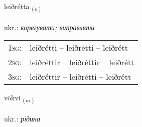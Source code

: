\documentclass[frontgrid, backgrid]{flacards}\usepackage[]{graphicx}\usepackage[]{xcolor}
\begin{document}
\renewcommand{\flhead}{\vskip5pt \fboxsep=0pt {\small\bfseries\footnotesize Nafnorð | дієслово}}
\renewcommand{\fcfoot}{\vskip5pt \fboxsep=0pt \hspace{2pt}{\small\bfseries\footnotesize 3K}}

\renewcommand{\blhead}{\vskip5pt {\small\bfseries\footnotesize Nafnorð | дієслово }}
\renewcommand{\bcfoot}{\vskip5pt \hspace{2pt}{\small\bfseries\footnotesize 3K}}


{leiðrétta \small{\textsubscript{(\textit{v.})}} \\[1ex] %
\textphonetic{[leiðrjɛhta]} \\
ukr.: \emph{корегувати; виправляти} \\  [2ex]
\renewcommand*{\arraystretch}{0.8}
\begin{tabular}{p{1cm}l}
\textsc{1sg}: & leiðrétti -- leiðrétti -- leiðrétt \\ 
\textsc{2sg}: & leiðréttir -- leiðréttir -- leiðrétt \\ 
\textsc{3sg}: & leiðréttir -- leiðrétti -- leiðrétt \\ 
\end{tabular}
}

\renewcommand{\flhead}{\vskip5pt \fboxsep=0pt {\small\bfseries\footnotesize Nafnorð | іменник}}
\renewcommand{\fcfoot}{\vskip5pt \fboxsep=0pt \hspace{2pt}{\small\bfseries\footnotesize 3K}}

\renewcommand{\blhead}{\vskip5pt {\small\bfseries\footnotesize Nafnorð | іменник }}
\renewcommand{\bcfoot}{\vskip5pt \hspace{2pt}{\small\bfseries\footnotesize 3K}}


{vökvi \small{\textsubscript{(\textit{m.})}} \\[1ex] %
\textphonetic{[vœkvɪ]} \\
ukr.: \emph{рідина} \\  [2ex]
\renewcommand*{\arraystretch}{0.8}
}
\end{document}
